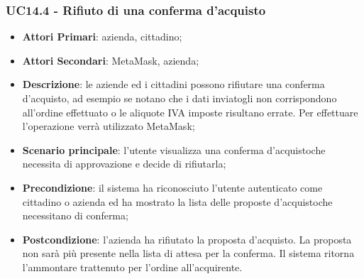 \subsubsection{UC14.4 - Rifiuto di una conferma d'acquisto}
\begin{itemize}
	\item \textbf{Attori Primari}: azienda, cittadino;
	\item \textbf{Attori Secondari}: MetaMask\glo, azienda;
	\item \textbf{Descrizione}: le aziende ed i cittadini possono rifiutare una conferma d'acquisto\glo, ad esempio se notano che i dati inviatogli non corrispondono all'ordine effettuato o le aliquote IVA imposte risultano errate. Per effettuare l'operazione verrà utilizzato MetaMask\glo;
	\item \textbf{Scenario principale}: l'utente visualizza una conferma d'acquisto\glosp che necessita di approvazione e decide di rifiutarla;

	\item \textbf{Precondizione}: il sistema ha riconosciuto l'utente autenticato come cittadino o azienda ed ha mostrato la lista delle proposte d'acquisto\glosp che necessitano di conferma;
	\item \textbf{Postcondizione}: l'azienda ha rifiutato la proposta 
	d'acquisto\glo. La proposta non sarà più presente nella lista di attesa per 
	la conferma. Il sistema ritorna l'ammontare trattenuto per l'ordine 
	all'acquirente.
\end{itemize}
